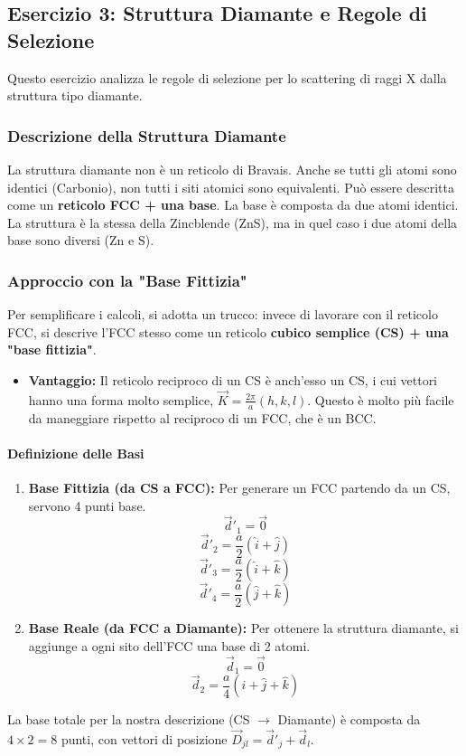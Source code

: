 \subsection{Esercizio 3: Struttura Diamante e Regole di Selezione}
Questo esercizio analizza le regole di selezione per lo scattering di raggi X dalla struttura tipo diamante.

\subsubsection{Descrizione della Struttura Diamante}
La struttura diamante non è un reticolo di Bravais. Anche se tutti gli atomi sono identici (Carbonio), non tutti i siti atomici sono equivalenti. Può essere descritta come un \textbf{reticolo FCC + una base}. La base è composta da due atomi identici.
La struttura è la stessa della Zincblende (ZnS), ma in quel caso i due atomi della base sono diversi (Zn e S).

\subsubsection{Approccio con la "Base Fittizia"}
Per semplificare i calcoli, si adotta un trucco: invece di lavorare con il reticolo FCC, si descrive l'FCC stesso come un reticolo \textbf{cubico semplice (CS) + una "base fittizia"}.
\begin{itemize}
    \item \textbf{Vantaggio:} Il reticolo reciproco di un CS è anch'esso un CS, i cui vettori hanno una forma molto semplice, $\vec{K} = \frac{2\pi}{a}(h,k,l)$. Questo è molto più facile da maneggiare rispetto al reciproco di un FCC, che è un BCC.
\end{itemize}

\paragraph{Definizione delle Basi}
\begin{enumerate}
    \item \textbf{Base Fittizia (da CS a FCC):} Per generare un FCC partendo da un CS, servono 4 punti base.
        $$ \vec{d}'_1 = \vec{0} $$
        $$ \vec{d}'_2 = \frac{a}{2}(\hat{i} + \hat{j}) $$
        $$ \vec{d}'_3 = \frac{a}{2}(\hat{i} + \hat{k}) $$
        $$ \vec{d}'_4 = \frac{a}{2}(\hat{j} + \hat{k}) $$
    \item \textbf{Base Reale (da FCC a Diamante):} Per ottenere la struttura diamante, si aggiunge a ogni sito dell'FCC una base di 2 atomi.
        $$ \vec{d}_1 = \vec{0} $$
        $$ \vec{d}_2 = \frac{a}{4}(\hat{i} + \hat{j} + \hat{k}) $$
\end{enumerate}
La base totale per la nostra descrizione (CS $\rightarrow$ Diamante) è composta da $4 \times 2 = 8$ punti, con vettori di posizione $\vec{D}_{jl} = \vec{d}'_j + \vec{d}_l$.

